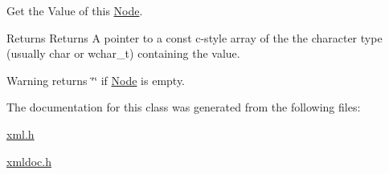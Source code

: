 Get the Value of this \hyperlink{classphys_1_1xml_1_1Node}{Node}. 

\begin{DoxyReturn}{Returns}
Returns A pointer to a const c-\/style array of the the character type (usually char or wchar\_\-t) containing the value. 
\end{DoxyReturn}
\begin{DoxyWarning}{Warning}
returns \char`\"{}\char`\"{} if \hyperlink{classphys_1_1xml_1_1Node}{Node} is empty. 
\end{DoxyWarning}


The documentation for this class was generated from the following files:\begin{DoxyCompactItemize}
\item 
\hyperlink{xml_8h}{xml.h}\item 
\hyperlink{xmldoc_8h}{xmldoc.h}\end{DoxyCompactItemize}
